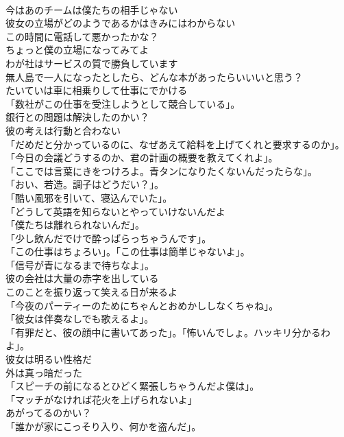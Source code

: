 \documentclass[8pt]{extreport}
\begin{document}
\begin{CJK}{UTF8}{min}
\\	今はあのチームは僕たちの相手じゃない	
\\	彼女の立場がどのようであるかはきみにはわからない	
\\	この時間に電話して悪かったかな？	
\\	ちょっと僕の立場になってみてよ	
\\	わが社はサービスの質で勝負しています	
\\	無人島で一人になったとしたら、どんな本があったらいいいと思う？	
\\	たいていは車に相乗りして仕事にでかける	
\\	「数社がこの仕事を受注しようとして競合している」。	
\\	銀行との問題は解決したのかい？	
\\	彼の考えは行動と合わない	
\\	「だめだと分かっているのに、なぜあえて給料を上げてくれと要求するのか」。	
\\	「今日の会議どうするのか、君の計画の概要を教えてくれよ」。	
\\	「ここでは言葉にきをつけろよ。青タンになりたくないんだったらな」。	
\\	「おい、若造。調子はどうだい？」。	
\\	「酷い風邪を引いて、寝込んでいた」。	
\\	「どうして英語を知らないとやっていけないんだよ	
\\	「僕たちは離れられないんだ」。	
\\	「少し飲んだでけで酔っぱらっちゃうんです」。	
\\	「この仕事はちょろい」。「この仕事は簡単じゃないよ」。	
\\	「信号が青になるまで待ちなよ」。	
\\	彼の会社は大量の赤字を出している	
\\	このことを振り返って笑える日が来るよ	
\\	「今夜のパーティーのためにちゃんとおめかししなくちゃね」。	
\\	「彼女は伴奏なしでも歌えるよ」。	
\\	「有罪だと、彼の顔中に書いてあった」。「怖いんでしょ。ハッキリ分かるわよ」。	
\\	彼女は明るい性格だ	
\\	外は真っ暗だった	
\\	「スピーチの前になるとひどく緊張しちゃうんだよ僕は」。	
\\	「マッチがなければ花火を上げられないよ」	
\\	あがってるのかい？	
\\	「誰かが家にこっそり入り、何かを盗んだ」。	

\end{CJK}
\end{document}
